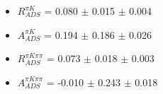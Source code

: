 \begin{itemize}
\item $R_{ADS}^{\pi K}$ = 0.080 $\pm$ 0.015 $\pm$ 0.004
\item $A_{ADS}^{\pi K}$ = 0.194 $\pm$ 0.186 $\pm$ 0.026
\item $R_{ADS}^{\pi K\pi\pi}$ = 0.073 $\pm$ 0.018 $\pm$ 0.003
\item $A_{ADS}^{\pi K\pi\pi}$ = -0.010 $\pm$ 0.243 $\pm$ 0.018
\end{itemize}
